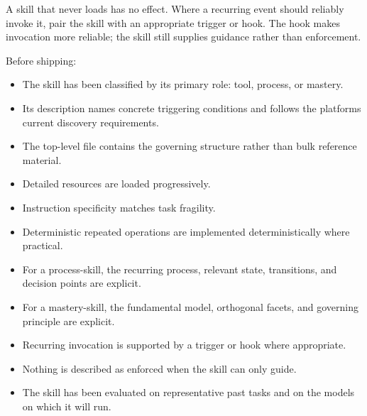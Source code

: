 
A skill that never loads has no effect. Where a recurring event should reliably invoke it, pair the skill with an appropriate trigger or hook. The hook makes invocation more reliable; the skill still supplies guidance rather than enforcement.

Before shipping:

\begin{itemize}
\tightlist
\item[$\square$]
  The skill has been classified by its primary role: tool, process, or mastery.
\item[$\square$]
  Its description names concrete triggering conditions and follows the platform\textquotesingle s current discovery requirements.
\item[$\square$]
  The top-level file contains the governing structure rather than bulk reference material.
\item[$\square$]
  Detailed resources are loaded progressively.
\item[$\square$]
  Instruction specificity matches task fragility.
\item[$\square$]
  Deterministic repeated operations are implemented deterministically where practical.
\item[$\square$]
  For a process-skill, the recurring process, relevant state, transitions, and decision points are explicit.
\item[$\square$]
  For a mastery-skill, the fundamental model, orthogonal facets, and governing principle are explicit.
\item[$\square$]
  Recurring invocation is supported by a trigger or hook where appropriate.
\item[$\square$]
  Nothing is described as enforced when the skill can only guide.
\item[$\square$]
  The skill has been evaluated on representative past tasks and on the models on which it will run.
\end{itemize}
